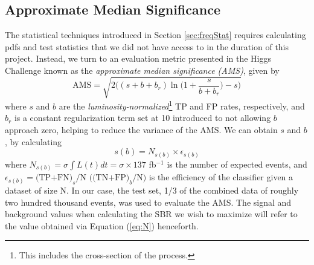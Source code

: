 \subsection{Approximate Median Significance}
\label{sec:AMS}
The statistical techniques introduced in Section \ref{sec:freqStat} requires calculating pdfs and test statistics that we did not have access to in the duration of this project. Instead, we turn to an evaluation metric presented in the Higgs Challenge \cite{adam-bourdarios_learning_2014} known as the \textit{approximate median significance (AMS)}, given by
\begin{equation}
    \text{AMS} = \sqrt{2\Big((s+b+b_r)\ln\Big(1+\frac{s}{b+b_r}\Big)-s\Big)}
    \label{eq:AMS}
\end{equation}
where $s$ and $b$ are the \textit{luminosity-normalized}\footnote{This includes the cross-section of the process.} TP and FP rates, respectively, and $b_r$ is a constant regularization term set at 10 introduced to not allowing $b$ approach zero, helping to reduce the variance of the AMS. We can obtain $s$ and $b$, by calculating
\begin{equation}
    s(b) = N_{s(b)}\times \epsilon_{s(b)} 
    \label{eq:N}
\end{equation}
where $N_{s(b)} = \sigma \int L(t) dt = \sigma \times 137$ fb$^{-1}$ \cite{thomson2013modern} is the number of expected events, and $\epsilon_{s(b)}=\text{(TP+FN)}_s/\text{N}$ $ \big(\text{(TN+FP)}_b/\text{N}\big)$  is the efficiency of the classifier given a dataset of size N. In our case, the test set, 1/3 of the combined data of roughly two hundred thousand events, was used to evaluate the AMS. The signal and background values when calculating the SBR we wish to maximize will refer to the value obtained via Equation (\ref{eq:N}) henceforth. \\

